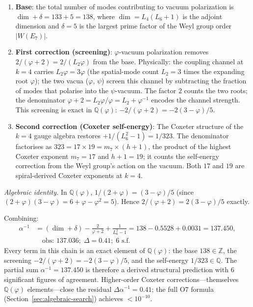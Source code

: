 \documentclass[12pt,a4paper]{article}
\begin{document}
\begin{enumerate}
\item \textbf{Base}: the total number of modes contributing to vacuum polarization is $\dim + \delta = 133 + 5 = 138$, where $\dim = L_4(L_6+1)$ is the adjoint dimension and $\delta = 5$ is the largest prime factor of the Weyl group order $|W(E_7)|$.
\item \textbf{First correction (screening)}: $\varphi$-vacuum polarization removes $2/(\varphi + 2) = 2/(L_2 \varphi)$ from the base. Physically: the coupling channel at $k = 4$ carries $L_2\varphi = 3\varphi$ (the spatial-mode count $L_2 = 3$ times the expanding root $\varphi$); the two vacua ($\varphi$, $\psi$) screen this channel by subtracting the fraction of modes that polarise into the $\psi$-vacuum. The factor $2$ counts the two roots; the denominator $\varphi + 2 = L_2\varphi/\varphi = L_2 + \varphi^{-1}$ encodes the channel strength. This screening is exact in $\mathbb{Q}(\varphi)$: $-2/(\varphi{+}2) = -2(3{-}\varphi)/5$.
\item \textbf{Second correction (Coxeter self-energy)}: The Coxeter structure of the $k = 4$ gauge algebra restores $+1/(L_6^2 - 1) = 1/323$. The denominator factorises as $323 = 17 \times 19 = m_7 \times (h + 1)$, the product of the highest Coxeter exponent $m_7 = 17$ and $h + 1 = 19$; it counts the self-energy correction from the Weyl group's action on the vacuum. Both $17$ and $19$ are spiral-derived Coxeter exponents at $k = 4$.
\end{enumerate}

\noindent\textit{Algebraic identity.} In $\mathbb{Q}(\varphi)$, $1/(2+\varphi) = (3-\varphi)/5$ (since $(2+\varphi)(3-\varphi) = 6 + \varphi - \varphi^2 = 5$). Hence $2/(\varphi+2) = 2(3-\varphi)/5$ exactly.

\noindent Combining:
\begin{align}
\alpha^{-1} &= (\dim + \delta) - \frac{2}{\varphi + 2} + \frac{1}{L_6^2 - 1}
= 138 - 0.5528 + 0.0031 = 137.450,\\
&\quad \text{obs: } 137.036;\; \Delta = 0.41;\; \text{6 s.f.}
\end{align}
Every term in this chain is an exact element of $\mathbb{Q}(\varphi)$: the base $138 \in \mathbb{Z}$, the screening $-2/(\varphi{+}2) = -2(3{-}\varphi)/5$, and the self-energy $1/323 \in \mathbb{Q}$.
The partial sum $\alpha^{-1} = 137.450$ is therefore a derived structural prediction with 6 significant figures of agreement.
Higher-order Coxeter corrections---themselves $\mathbb{Q}(\varphi)$ elements---close the residual $\Delta\alpha^{-1} = 0.41$; the full O7 formula (Section~\ref{sec:algebraic-search}) achieves $< 10^{-10}$.
\end{document}
